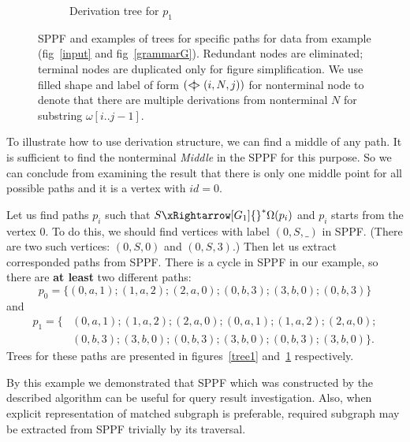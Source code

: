 \begin{figure}
\begin{center}
\begin{subfigure}[b]{0.33\textwidth}
        \caption{Derivation tree  for $p_1$}
        \label{tree2}        
    \end{subfigure}
    \caption{SPPF and examples of trees for specific paths for data from example (fig~\ref{input} and fig~\ref{grammarG}). Redundant nodes are eliminated; terminal nodes are duplicated only for figure simplification.
    We use filled shape and label of form $(<\mkern-11mu | \mkern-11mu> (i, N, j))$ for nonterminal node to denote that there are multiple derivations from nonterminal $N$ for substring $\omega[i..j-1]$. 
}
    \label{sppfSample}
    \end{center}                
\end{figure}

To illustrate how to use derivation structure, we can find a middle of any path. It is sufficient to find the nonterminal \textit{Middle} in the SPPF for this purpose.
So we can conclude from examining the result that there is only one middle point for all possible paths and it is a vertex with $id = 0$.

Let us find paths $p_i$ such that $S {\xRightarrow[G_1]{}}^{*} \Omega(p_i)$ and $p_i$ starts from the vertex $0$.
To do this, we should find vertices with label $(0, S, \_)$ in SPPF.
(There are two such vertices: $(0, S, 0)$ and $(0, S, 3)$.)
Then let us extract corresponded paths from SPPF.
There is a cycle in SPPF in our example, so there are \textbf{at least} two different paths: $$p_0=\{(0,a,1);(1,a,2);(2,a,0);(0,b,3);(3,b,0);(0,b,3)\}$$ and 
\begin{align*} 
p_1=\{&(0,a,1);(1,a,2);(2,a,0);(0,a,1);(1,a,2);(2,a,0);\\&(0,b,3);(3,b,0);(0,b,3);(3,b,0);(0,b,3);(3,b,0)\}.
\end{align*}
 Trees for these paths are presented in figures~\ref{tree1} and~\ref{tree2} respectively.

By this example we demonstrated that SPPF which was constructed by the described algorithm can be useful for query result investigation. 
Also, when explicit representation of matched subgraph is preferable, required subgraph may be extracted from SPPF trivially by its traversal.
